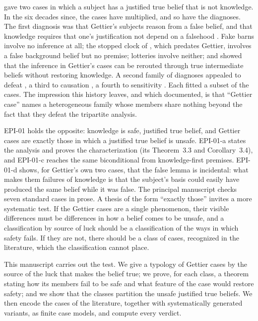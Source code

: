 \documentclass{situationist-preprint}
\begin{document}
\citet{Gettier1963} gave two cases in which a subject has a justified true belief that is not knowledge. In the six decades since, the cases have multiplied, and so have the diagnoses. The first diagnosis was that Gettier's subjects reason from a false belief, and that knowledge requires that one's justification not depend on a falsehood \citep{Clark1963,Harman1973}. Fake barns \citep{Goldman1976} involve no inference at all; the stopped clock of \citet{Russell1948}, which predates Gettier, involves a false background belief but no premise; lotteries involve neither; and \citet{Feldman1974} showed that the inference in Gettier's cases can be rerouted through true intermediate beliefs without restoring knowledge. A second family of diagnoses appealed to defeat \citep{LehrerPaxson1969}, a third to causation \citep{Goldman1967}, a fourth to sensitivity \citep{Nozick1981}. Each fitted a subset of the cases. The impression this history leaves, and which \citet{Shope1983} documented, is that \enquote{Gettier case} names a heterogeneous family whose members share nothing beyond the fact that they defeat the tripartite analysis.

EPI-01 holds the opposite: knowledge is safe, justified true belief, and Gettier cases are exactly those in which a justified true belief is unsafe. EPI-01-a states the analysis and proves the characterization (its Theorem~3.3 and Corollary~3.4), and EPI-01-c reaches the same biconditional from knowledge-first premises. EPI-01-d shows, for Gettier's own two cases, that the false lemma is incidental: what makes them failures of knowledge is that the subject's basis could easily have produced the same belief while it was false. The principal manuscript checks seven standard cases in prose. A thesis of the form \enquote{exactly those} invites a more systematic test. If the Gettier cases are a single phenomenon, their visible differences must be differences in how a belief comes to be unsafe, and a classification by source of luck should be a classification of the ways in which safety fails. If they are not, there should be a class of cases, recognized in the literature, which the classification cannot place.

This manuscript carries out the test. We give a typology of Gettier cases by the source of the luck that makes the belief true; we prove, for each class, a theorem stating how its members fail to be safe and what feature of the case would restore safety; and we show that the classes partition the unsafe justified true beliefs. We then encode the cases of the literature, together with systematically generated variants, as finite case models, and compute every verdict.
\end{document}
